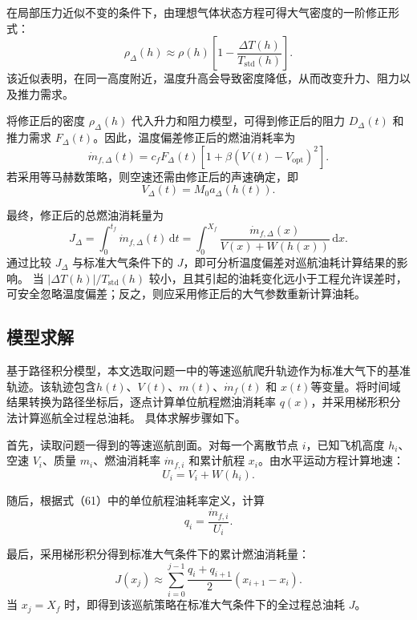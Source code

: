 \documentclass[UTF8]{ctexart}
\begin{document}
在局部压力近似不变的条件下，由理想气体状态方程可得大气密度的一阶修正形式：
\begin{equation}
    \rho_{\Delta}(h)
    \approx
    \rho(h)
    \left[
    1-\frac{\Delta T(h)}{T_{\mathrm{std}}(h)}
    \right].
    \label{eq:q2_rho_delta}
\end{equation}
该近似表明，在同一高度附近，温度升高会导致密度降低，从而改变升力、阻力以及推力需求。

将修正后的密度 $\rho_{\Delta}(h)$ 代入升力和阻力模型，可得到修正后的阻力
$D_{\Delta}(t)$ 和推力需求 $F_{\Delta}(t)$。因此，温度偏差修正后的燃油消耗率为
\begin{equation}
    \dot m_{f,\Delta}(t)
    =
    c_fF_{\Delta}(t)
    \left[
    1+\beta\left(V(t)-V_{\mathrm{opt}}\right)^2
    \right].
    \label{eq:q2_fuel_delta}
\end{equation}
若采用等马赫数策略，则空速还需由修正后的声速确定，即
\begin{equation}
    V_{\Delta}(t)=M_0a_{\Delta}(h(t)).
    \label{eq:q2_V_delta}
\end{equation}

最终，修正后的总燃油消耗量为
\begin{equation}
    J_{\Delta}
    =
    \int_{0}^{t_f}\dot m_{f,\Delta}(t)\,\mathrm{d}t
    =
    \int_{0}^{X_f}
    \frac{\dot m_{f,\Delta}(x)}{V(x)+W(h(x))}\,\mathrm{d}x.
    \label{eq:q2_total_delta}
\end{equation}
通过比较 $J_{\Delta}$ 与标准大气条件下的 $J$，即可分析温度偏差对巡航油耗计算结果的影响。
当 $\left|\Delta T(h)\right|/T_{\mathrm{std}}(h)$ 较小，且其引起的油耗变化远小于工程允许误差时，
可安全忽略温度偏差；反之，则应采用修正后的大气参数重新计算油耗。
\subsection{模型求解}
基于路径积分模型，本文选取问题一中的等速巡航爬升轨迹作为标准大气下的基准轨迹。该轨迹包含$h(t)$、$V(t)$、$m(t)$、$\dot m_f(t)$ 和 $x(t)$等变量。将时间域结果转换为路径坐标后，逐点计算单位航程燃油消耗率 $q(x)$，并采用梯形积分法计算巡航全过程总油耗。
具体求解步骤如下。

首先，读取问题一得到的等速巡航剖面。对每一个离散节点 $i$，已知飞机高度 $h_i$、空速 $V_i$、质量 $m_i$、燃油消耗率 $\dot m_{f,i}$ 和累计航程 $x_i$。由水平运动方程计算地速：
$$U_i=V_i+W(h_i).$$

随后，根据式（61）中的单位航程油耗率定义，计算
$$q_i=\frac{\dot m_{f,i}}{U_i}.$$

最后，采用梯形积分得到标准大气条件下的累计燃油消耗量：
$$J(x_j)\approx \sum_{i=0}^{j-1}\frac{q_i+q_{i+1}}{2}(x_{i+1}-x_i).$$
当 $x_j=X_f$ 时，即得到该巡航策略在标准大气条件下的全过程总油耗 $J$。
\end{document}
